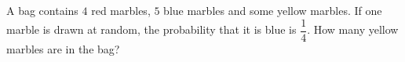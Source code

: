 A bag contains $4$ red marbles, $5$ blue marbles and some yellow marbles. If one marble is drawn at random, the probability that it is blue is $\dfrac{1}{4}$. How many yellow marbles are in the bag?
